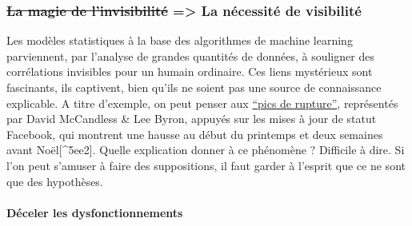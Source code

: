 \documentclass[]{article}
\let\oldparagraph\paragraph
\renewcommand{\paragraph}[1]{\oldparagraph{#1}\mbox{}}
\begin{document}
\newpage

\hypertarget{la-magie-de-linvisibilituxe9-la-nuxe9cessituxe9-de-visibilituxe9}{%
\subsubsection{\texorpdfstring{\sout{La magie de l'invisibilité}
=\textgreater{} La nécessité de
visibilité}{La magie de l'invisibilité =\textgreater{} La nécessité de visibilité}}\label{la-magie-de-linvisibilituxe9-la-nuxe9cessituxe9-de-visibilituxe9}}

Les modèles statistiques à la base des algorithmes de machine learning
parviennent, par l'analyse de grandes quantités de données, à souligner
des corrélations invisibles pour un humain ordinaire. Ces liens
mystérieux sont fascinants, ils captivent, bien qu'ils ne soient pas une
source de connaissance explicable. A titre d'exemple, on peut penser aux
\href{(https://informationisbeautiful.net/2010/peak-break-up-times-on-facebook/)}{``pics
de rupture''}, représentés par David McCandless \& Lee Byron, appuyés
sur les mises à jour de statut Facebook, qui montrent une hausse au
début du printemps et deux semaines avant Noël{[}\^{}5ee2{]}. Quelle
explication donner à ce phénomène ? Difficile à dire. Si l'on peut
s'amuser à faire des suppositions, il faut garder à l'esprit que ce ne
sont que des hypothèses.

\hypertarget{duxe9celer-les-dysfonctionnements}{%
\paragraph{Déceler les
dysfonctionnements}\label{duxe9celer-les-dysfonctionnements}}
\end{document}

